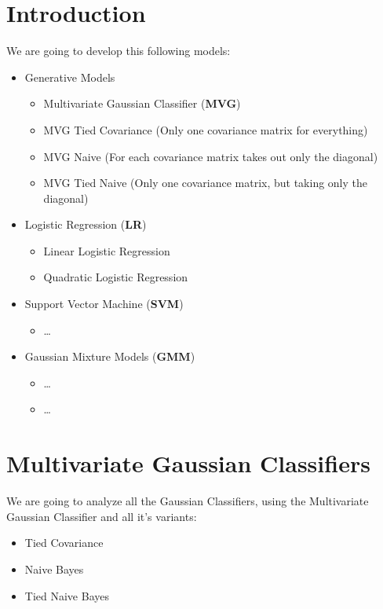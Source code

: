 \documentclass[english]{report}
\begin{document}
\section{Introduction}
We are going to develop this following models:
\begin{itemize}
    \item Generative Models
    \begin{itemize}
        \item Multivariate Gaussian Classifier (\textbf{MVG})
        \item MVG Tied Covariance (Only one covariance matrix for everything)
        \item MVG Naive (For each covariance matrix takes out only the diagonal)
        \item MVG Tied Naive (Only one covariance matrix, but taking only the diagonal)
    \end{itemize}
    \item Logistic Regression (\textbf{LR})
    \begin{itemize}
        \item Linear Logistic Regression
        \item Quadratic Logistic Regression
    \end{itemize}
    \item Support Vector Machine (\textbf{SVM})
    \begin{itemize}
        \item \dots
    \end{itemize}
    \item Gaussian Mixture Models (\textbf{GMM})
    \begin{itemize}
        \item \dots
        \item \dots
    \end{itemize}
\end{itemize}

\clearpage

\section{Multivariate Gaussian Classifiers}

We are going to analyze all the Gaussian Classifiers, using the Multivariate Gaussian Classifier and all it's variants: 
\begin{itemize}
    \item Tied Covariance
    \item Naive Bayes
    \item Tied Naive Bayes
\end{itemize}
\end{document}
